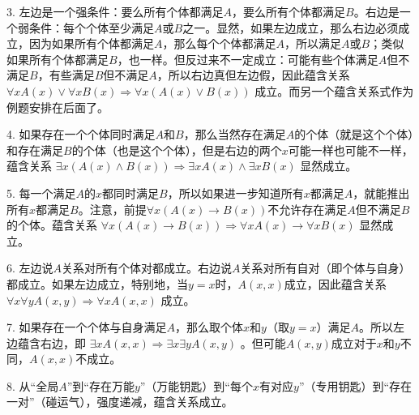 \documentclass[lang=cn,11pt]{elegantbook}
\begin{document}
3. 左边是一个强条件：要么所有个体都满足$A$，要么所有个体都满足$B$。右边是一个弱条件：每个个体至少满足$A$或$B$之一。显然，如果左边成立，那么右边必须成立，因为如果所有个体都满足$A$，那么每个个体都满足$A$，所以满足$A$或$B$；类似如果所有个体都满足$B$，也一样。但反过来不一定成立：可能有些个体满足$A$但不满足$B$，有些满足$B$但不满足$A$，所以右边真但左边假，因此蕴含关系 $\forall xA(x)\lor \forall xB(x)\Rightarrow \forall x(A(x)\lor B(x))$ 成立。而另一个蕴含关系式作为例题安排在后面了。

4. 如果存在一个个体同时满足$A$和$B$，那么当然存在满足$A$的个体（就是这个个体）和存在满足$B$的个体（也是这个个体），但是右边的两个$x$可能一样也可能不一样，蕴含关系 $\exists x(A(x)\land B(x))\Rightarrow \exists xA(x)\land \exists xB(x)$ 显然成立。

5. 每一个满足$A$的$x$都同时满足$B$，所以如果进一步知道所有$x$都满足$A$，就能推出所有$x$都满足$B$。注意，前提$\forall x(A(x)\to B(x))$不允许存在满足$A$但不满足$B$的个体。蕴含关系 $\forall x(A(x)\to B(x))\Rightarrow \forall xA(x)\to \forall xB(x)$ 显然成立。

6. 左边说$A$关系对所有个体对都成立。右边说$A$关系对所有自对（即个体与自身）都成立。如果左边成立，特别地，当$y=x$时，$A(x,x)$成立，因此蕴含关系 $\forall x\forall yA(x,y)\Rightarrow \forall xA(x,x)$ 成立。

7. 如果存在一个个体与自身满足$A$，那么取个体$x$和$y$（取$y=x$）满足$A$。所以左边蕴含右边，即 $\exists xA(x,x)\Rightarrow \exists x\exists yA(x,y)$ 。但可能$A(x,y)$成立对于$x$和$y$不同，$A(x,x)$不成立。

8. 从“全局$A$”到“存在万能$y$”（万能钥匙）到“每个$x$有对应$y$”（专用钥匙）到“存在一对”（碰运气），强度递减，蕴含关系成立。
\end{document}
